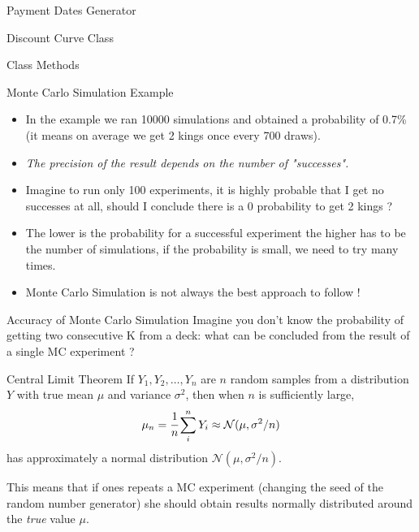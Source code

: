 \documentclass{beamer}
\begin{document}
\begin{frame}[fragile]{Payment Dates Generator}
\begin{itemize}
\begin{frame}{Discount Curve Class}
\begin{frame}{Class Methods}
\begin{itemize}
\begin{iptyhon}
\begin{frame}{Monte Carlo Simulation Example}
\begin{itemize}
    \item In the example we ran 10000 simulations and obtained a probability of 0.7\% (it means on average we get 2 kings once every 700 draws).
    \item \emph{The precision of the result depends on the number of "successes".}
    \item Imagine to run only 100 experiments, it is highly probable that I get no successes at all, should I conclude there is a 0 probability to get 2 kings ?
    \item The lower is the probability for a successful experiment the higher has to be the number of simulations, if the probability is small, we need to try many times.
    \item Monte Carlo Simulation is not always the best approach to follow !
\end{itemize}
\end{frame}

\begin{frame}{Accuracy of Monte Carlo Simulation}
Imagine you don't know the probability of getting two consecutive K from a deck: what can be concluded from the result of a single MC experiment ?
\begin{block}{Central Limit Theorem}    
If $Y_1, Y_2,\dots, Y_n$ are $n$ random samples from a distribution $Y$ with true mean $\mu$ and variance $\sigma^{2}$, then when $n$ is sufficiently large, 
\begin{equation*}
\mu_n = \cfrac{1}{n}\sum_i^n Y_i \approx \mathcal{N}(\mu, \sigma^2/n)
\end{equation*}
has approximately a normal distribution $\mathcal{N}(\mu, \sigma^2/n)$. 

This means that if ones repeats a MC experiment (changing the seed of the random number generator) she should obtain results normally distributed around the \emph{true} value $\mu$.
\end{block}
\end{frame}


\end{iptyhon}
\end{itemize}
\end{frame}
\end{frame}
\end{itemize}
\end{frame}
\end{document}
